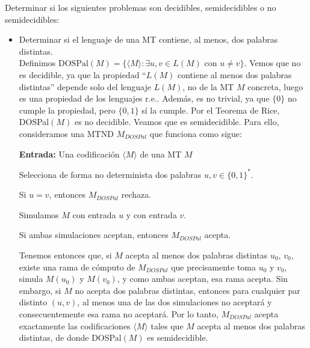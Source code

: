 
\begin{ejercicio}
    Determinar si los siguientes problemas son decidibles, semidecidibles o no semidecidibles:
    \begin{itemize}
        \item[a)] Determinar si el lenguaje de una MT contiene, al menos, dos palabras distintas.\\
        
        Definimos $\text{DOSPal}(M) = \{\langle M \rangle : \exists u,v \in L(M) \text{ con } u \neq v\}$. Vemos que 
        no es decidible, ya que la propiedad ``$L(M)$ contiene al menos dos palabras distintas'' depende solo
        del lenguaje $L(M)$, no de la MT $M$ concreta, luego es una propiedad de los lenguajes r.e.. Además, es no trivial,
        ya que $\{0\}$ no cumple la propiedad, pero $\{0,1\}$ sí la cumple. Por el Teorema de Rice, DOSPal$(M)$ es no
        decidible. Veamos que es semidecidible. Para ello, consideramos una MTND $M_{DOSPal}$ que funciona como sigue:

        \begin{algorithm}
            \caption{MTND $M_{DOSPAL}$}
            \label{algorithm:dospal-semidecidible}
            \begin{algorithmic}
                \State \textbf{Entrada:} Una codificación $\langle M \rangle$ de una MT $M$

                \State Selecciona de forma no determinista dos palabras $u,v \in \{0,1\}^{*}$.

                \State Si $u = v$, entonces $M_{DOSPal}$ rechaza.

                \State Simulamos $M$ con entrada $u$ y con entrada $v$. %

                \State Si ambas simulaciones aceptan, entonces $M_{DOSPal}$ acepta.
            \end{algorithmic}
        \end{algorithm}

        Tenemos entonces que, si $M$ acepta al menos dos palabras distintas $u_0$, $v_0$, existe una rama de cómputo de 
        $M_{DOSPal}$ que precisamente toma $u_0$ y $v_0$, simula $M(u_0)$ y $M(v_0)$, y como ambas aceptan, esa rama acepta. 
        Sin embargo, si $M$ no acepta dos palabras distintas, entonces para cualquier par distinto $(u,v)$, al menos una de 
        las dos simulaciones no aceptará y consecuentemente esa rama no aceptará. Por lo tanto, $M_{DOSPal}$ acepta 
        exactamente las codificaciones $\langle M \rangle$ tales que $M$ acepta al menos dos palabras distintas, 
        de donde DOSPal$(M)$ es semidecidible.


\end{itemize}
\end{ejercicio}
